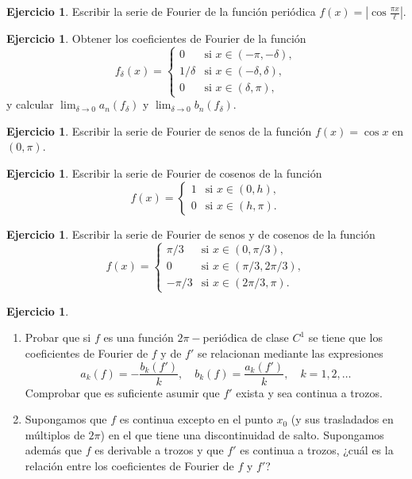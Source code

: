 \documentclass[12pt, a4paper]{amsbook}
\theoremstyle{remark}
\theoremstyle{definition}
\newtheorem{ejer}[teo]{Ejercicio}
\numberwithin{section}{chapter}
\numberwithin{subsection}{section}
\numberwithin{equation}{section}
\numberwithin{figure}{chapter}
\begin{document}
\begin{ejer}
Escribir la serie de Fourier de la función periódica $f(x) =\left|\cos \frac{\pi x}{\ell}\right|$.
\end{ejer}

\begin{ejer}
Obtener los coeficientes de Fourier de la función
$$
f_\delta(x) = \begin{cases}
0 & \text{si } x \in (-\pi, -\delta),\\
1/\delta & \text{si } x\in (-\delta, \delta),\\
0 & \text{si } x\in (\delta, \pi),
\end{cases}
$$
y calcular $\lim_{\delta\to 0} a_n(f_\delta)$ y $\lim_{\delta\to 0} b_n(f_\delta)$.
\end{ejer}

\begin{ejer}
Escribir la serie de Fourier de senos de la función $f(x) = \cos x$ en $(0, \pi)$.
\end{ejer}

\begin{ejer}
Escribir la serie de Fourier de cosenos de la función
$$
f(x) = \begin{cases}
1 & \text{si } x \in (0,h),\\
0 & \text{si } x\in (h,\pi).
\end{cases}
$$
\end{ejer}

\begin{ejer}
Escribir la serie de Fourier de senos y de cosenos de la función
$$
f(x)=\begin{cases}
\pi/3 & \text{si } x\in (0,\pi/3),\\
0 & \text{si } x\in (\pi/3, 2\pi/3),\\
-\pi/3 & \text{si } x\in (2\pi/3,\pi).
\end{cases}
$$
\end{ejer}


\begin{ejer}
\begin{enumerate}
\item Probar que si $f$ es una función $2\pi-$periódica de clase $C^1$ se tiene que los coeficientes de Fourier de $f$ y de $f'$ se relacionan mediante las expresiones
$$
a_k(f) = -\frac{b_k(f')}{k},\quad b_k(f) = \frac{a_k(f')}{k},\quad k=1,2,\dots
$$
Comprobar que es suficiente asumir que $f'$ exista y sea continua a trozos.

\item Supongamos que $f$ es continua excepto en el punto $x_0$ (y sus trasladados en múltiplos de $2\pi$) en el que tiene una discontinuidad de salto. Supongamos además que $f$ es derivable a trozos y que $f'$ es continua a trozos, ¿cuál es la relación entre los coeficientes de Fourier de $f$ y $f'$?
\end{enumerate}
\end{ejer}
\end{document}
